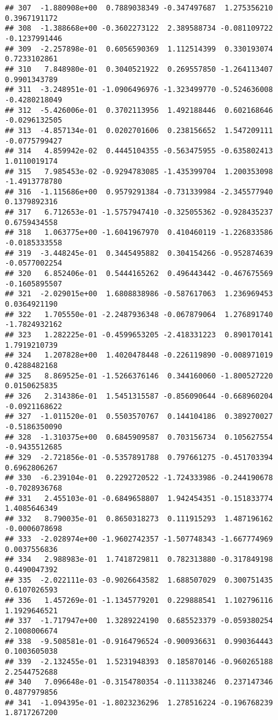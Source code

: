 \documentclass[
]{article}
\begin{document}
\begin{verbatim}
## 307  -1.880908e+00  0.7889038349 -0.347497687  1.275356210  0.3967191172
## 308  -1.388668e+00 -0.3602273122  2.389588734 -0.081109722 -0.1237991446
## 309  -2.257898e-01  0.6056590369  1.112514399  0.330193074  0.7233102861
## 310   7.848980e-01  0.3040521922  0.269557850 -1.264113407  0.9901343789
## 311  -3.248951e-01 -1.0906496976 -1.323499770 -0.524636008 -0.4280218049
## 312  -5.426006e-01  0.3702113956  1.492188446  0.602168646 -0.0296132505
## 313  -4.857134e-01  0.0202701606  0.238156652  1.547209111 -0.0775799427
## 314   4.859942e-02  0.4445104355 -0.563475955 -0.635802413  1.0110019174
## 315   7.985453e-02 -0.9294783085 -1.435399704  1.200353098 -1.4913778780
## 316  -1.115686e+00  0.9579291384 -0.731339984 -2.345577940  0.1379892316
## 317   6.712653e-01 -1.5757947410 -0.325055362 -0.928435237  0.6759434558
## 318   1.063775e+00 -1.6041967970  0.410460119 -1.226833586 -0.0185333558
## 319  -3.448245e-01  0.3445495882  0.304154266 -0.952874639 -0.0577002254
## 320   6.852406e-01  0.5444165262  0.496443442 -0.467675569 -0.1605895507
## 321  -2.029015e+00  1.6808838986 -0.587617063  1.236969453  0.0364921190
## 322   1.705550e-01 -2.2487936348 -0.067879064  1.276891740 -1.7824932162
## 323   1.282225e-01 -0.4599653205 -2.418331223  0.890170141  1.7919210739
## 324   1.207828e+00  1.4020478448 -0.226119890 -0.008971019  0.4288482168
## 325   8.869525e-01 -1.5266376146  0.344160060 -1.800527220  0.0150625835
## 326   2.314386e-01  1.5451315587 -0.856090644 -0.668960204 -0.0921168622
## 327  -1.011520e-01  0.5503570767  0.144104186  0.389270027 -0.5186350090
## 328  -1.310375e+00  0.6845909587  0.703156734  0.105627554 -0.9435512685
## 329  -2.721856e-01 -0.5357891788  0.797661275 -0.451703394  0.6962806267
## 330  -6.239104e-01  0.2292720522 -1.724333986 -0.244190678 -0.7028936768
## 331   2.455103e-01 -0.6849658807  1.942454351 -0.151833774  1.4085646349
## 332   8.790035e-01  0.8650318273  0.111915293  1.487196162 -0.0006078698
## 333  -2.028974e+00 -1.9602742357 -1.507748343 -1.667774969  0.0037556836
## 334   2.988983e-01  1.7418729811  0.782313880 -0.317849198  0.4490047392
## 335  -2.022111e-03 -0.9026643582  1.688507029  0.300751435  0.6107026593
## 336   1.457269e-01 -1.1345779201  0.229888541  1.102796116  1.1929646521
## 337  -1.717947e+00  1.3289224190  0.685523379 -0.059380254  2.1008006674
## 338  -9.508581e-01 -0.9164796524 -0.900936631  0.990364443  0.1003605038
## 339  -2.132455e-01  1.5231948393  0.185870146 -0.960265188  2.2544752688
## 340   7.096648e-01 -0.3154780354 -0.111338246  0.237147346  0.4877979856
## 341  -1.094395e-01 -1.8023236296  1.278516224 -0.196768239  1.8717267200

\end{verbatim}
\end{document}
